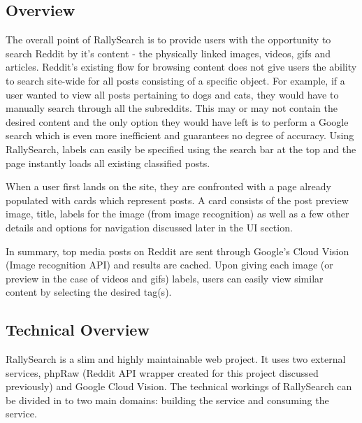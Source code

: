 \documentclass[msc,oneside]{ubcthesis}%
\begin{document}
\subsection{Overview}
The overall point of RallySearch is to provide users with the opportunity to search Reddit by it's content - the physically linked images, videos, gifs and articles. Reddit's existing flow for browsing content does not give users the ability to search site-wide for all posts consisting of a specific object. For example, if a user wanted to view all posts pertaining to dogs and cats, they would have to manually search through all the subreddits. This may or may not contain the desired content and the only option they would have left is to perform a Google search which is even more inefficient and guarantees no degree of accuracy. Using RallySearch, labels can easily be specified using the search bar at the top and the page instantly loads all existing classified posts.

When a user first lands on the site, they are confronted with a page already populated with cards which represent posts. A card consists of the post preview image, title, labels for the image (from image recognition) as well as a few other details and options for navigation discussed later in the UI section.

In summary, top media posts on Reddit are sent through Google's Cloud Vision (Image recognition API) and results are cached. Upon giving each image (or preview in the case of videos and gifs) labels, users can easily view similar content by selecting the desired tag(s). 

\subsection{Technical Overview}
RallySearch is a slim and highly maintainable web project. It uses two external services, phpRaw (Reddit API wrapper created for this project discussed previously) and Google Cloud Vision. The technical workings of RallySearch can be divided in to two main domains: building the service and consuming the service.
\end{document}
